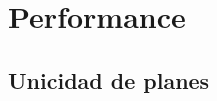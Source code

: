 \documentclass[10pt, xcolor=table, xcolor=dvipsnames]{beamer}
\begin{document}


% 
% 

\section{Performance}


\subsection*{Unicidad de planes}
\end{document}
